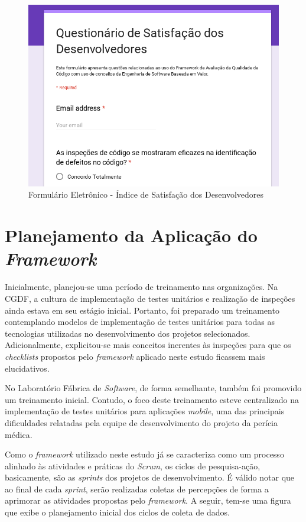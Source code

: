 \begin{figure}[!h]
\includegraphics[width=\textwidth]{figuras/questionario.png}
\caption{Formulário Eletrônico - Índice de Satisfação dos Desenvolvedores}
\end{figure}

\section{Planejamento da Aplicação do \textit{Framework}}

Inicialmente, planejou-se uma período de treinamento nas organizações. Na CGDF, a cultura de implementação de testes unitários e realização de inspeções ainda estava em seu estágio inicial. Portanto, foi preparado um treinamento contemplando modelos de implementação de testes unitários para todas as tecnologias utilizadas no desenvolvimento dos projetos selecionados. Adicionalmente, explicitou-se mais conceitos inerentes às inspeções para que os \textit{checklists} propostos pelo \textit{framework} aplicado neste estudo ficassem mais elucidativos.

No Laboratório Fábrica de \textit{Software}, de forma semelhante, também foi promovido um treinamento inicial. Contudo, o foco deste treinamento esteve centralizado na implementação de testes unitários para aplicações \textit{mobile}, uma das principais dificuldades relatadas pela equipe de desenvolvimento do projeto da perícia médica.

Como o \textit{framework} utilizado neste estudo já se caracteriza como um processo alinhado às atividades e práticas do \textit{Scrum}, os ciclos de pesquisa-ação, basicamente, são as \textit{sprints} dos projetos de desenvolvimento. É válido notar que ao final de cada \textit{sprint}, serão realizadas coletas de percepções de forma a aprimorar as atividades propostas pelo \textit{framework}. A seguir, tem-se uma figura que exibe o planejamento inicial dos ciclos de coleta de dados.

